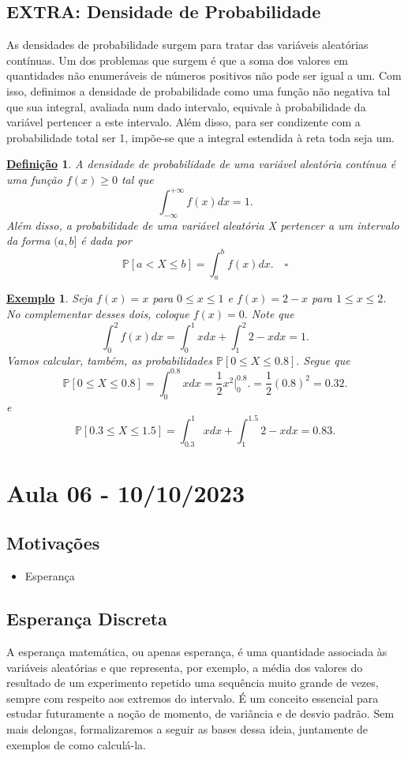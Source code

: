 \documentclass{article}
\newtheorem*{def*}{\underline{Defini\c c\~ao}}
\newtheorem{example}{\underline{Exemplo}}
\begin{document}
\subsection{EXTRA: Densidade de Probabilidade}
As densidades de probabilidade surgem para tratar das variáveis aleatórias contínuas. Um dos problemas 
que surgem é que a soma dos valores em quantidades não enumeráveis de números positivos não pode ser igual a um.
Com isso, definimos a densidade de probabilidade como uma função não negativa tal que sua integral, avaliada
num dado intervalo, equivale à probabilidade da variável pertencer a este intervalo. Além disso, para ser condizente com
a probabilidade total ser 1, impõe-se que a integral estendida à reta toda seja um.
\begin{def*}
  A densidade de probabilidade de uma variável aleatória contínua é uma função \(f(x)\geq 0\) tal que 
  \[
    \int_{-\infty}^{+\infty}f(x)dx = 1.
  \]
  Além disso, a probabilidade de uma variável aleatória X pertencer a um intervalo da forma \((a, b]\) é dada por 
  \[
    \mathbb{P}[a < X\leq b] = \int_{a}^{b}f(x)dx.\quad \square
  \]
\end{def*}
\begin{example}
  Seja \(f(x) = x\) para \(0\leq x\leq 1\) e \(f(x) = 2 - x\) para \(1\leq x\leq 2\). No complementar desses dois,
  coloque \(f(x)=0.\) Note que 
  \[
    \int_{0}^{2}f(x)dx = \int_{0}^{1}xdx + \int_{1}^{2}2-xdx = 1.
  \]
  Vamos calcular, também, as probabilidades \(\mathbb{P}[0\leq X\leq 0.8].\) Segue que 
  \[
    \mathbb{P}[0\leq X\leq 0.8]=\int_{0}^{0.8}xdx = \frac{1}{2}x^{2}\biggl|_{0}^{0.8}\biggr. = \frac{1}{2}(0.8)^{2} = 0.32.
  \]
  e 
  \[
    \mathbb{P}[0.3\leq X\leq 1.5] = \int_{0.3}^{1}xdx + \int_{1}^{1.5}2-xdx = 0.83.
  \]
\end{example}
\newpage

\section{Aula 06 - 10/10/2023}
\subsection{Motivações}
\begin{itemize}
  \item Esperança
\end{itemize}
\subsection{Esperança Discreta}
A esperança matemática, ou apenas esperança, é uma quantidade associada às variáveis aleatórias e que representa,
por exemplo, a média dos valores do resultado de um experimento repetido uma sequência muito grande de vezes, sempre com
respeito aos extremos do intervalo. É um conceito essencial para estudar futuramente a noção de momento, de variância e de desvio padrão.
Sem mais delongas, formalizaremos a seguir as bases dessa ideia, juntamente de exemplos de como calculá-la.
\end{document}
